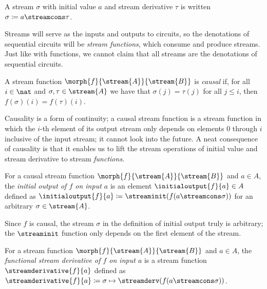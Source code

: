 \documentclass{lmcs}
\begin{document}
\begin{nota}
    A stream \(\sigma\) with initial value \(a\) and stream derivative
    \(\tau\) is written \(\sigma \coloneqq a \streamcons \tau\).
\end{nota}

Streams will serve as the inputs and outputs to circuits, so the denotations of
sequential circuits will be \emph{stream functions}, which consume and produce
streams.
Just like with functions, we cannot claim that all streams are the
denotations of sequential circuits.

\begin{defi}
    A stream function \(\morph{f}{\stream{A}}{\stream{B}}\) is \emph{causal} if,
    for all \(i \in \nat\) and \(\sigma,\tau \in \stream{A}\) we have that
    \(\sigma(j) = \tau(j)\) for all \(j \leq i\), then
    \(f(\sigma)(i) = f(\tau)(i)\).
\end{defi}

Causality is a form of continuity; a causal stream function is a stream function
in which the \(i\)-th element of its output stream only depends on elements
\(0\) through \(i\) inclusive of the input stream; it cannot look into the
future.
A neat consequence of causality is that it enables us to lift the stream
operations of initial value and stream derivative to stream \emph{functions}.

\begin{defi}
    For a causal stream function \(\morph{f}{\stream{A}}{\stream{B}}\) and
    \(a \in A\), the \emph{initial output of \(f\) on input \(a\)} is an element
    \(\initialoutput{f}{a} \in A\) defined as
    \(\initialoutput{f}{a} \coloneqq \streaminit(f(a \streamcons \sigma))\) for
    an arbitrary \(\sigma \in \stream{A}\).
\end{defi}

Since \(f\) is causal, the stream \(\sigma\) in the definition of initial
output truly is arbitrary; the \(\streaminit\) function only depends on the
first element of the stream.

\begin{defi}
    For a stream function \(\morph{f}{\stream{A}}{\stream{B}}\) and
    \(a \in A\), the
    \emph{functional stream derivative of \(f\) on input \(a\)} is a stream
    function \(\streamderivative{f}{a}\) defined as \(
    \streamderivative{f}{a}
    \coloneqq
    \sigma \mapsto \streamderv(f(a \streamcons \sigma))
    \).
\end{defi}
\end{document}
